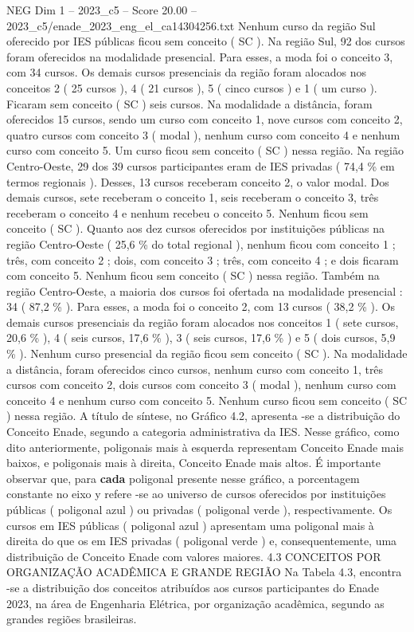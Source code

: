 \begin{textsample}{NEG Dim 1 – 2023\_c5 – Score 20.00 – 2023\_c5/enade\_2023\_eng\_el\_ca14304256.txt}
Nenhum curso da região Sul oferecido por IES públicas ficou sem conceito ( SC ).
Na região Sul, 92 dos cursos foram oferecidos na modalidade presencial.
Para esses, a moda foi o conceito 3, com 34 cursos.
Os demais cursos presenciais da região foram alocados nos conceitos 2 ( 25 cursos ), 4 ( 21 cursos ), 5 ( cinco cursos ) e 1 ( um curso ).
Ficaram sem conceito ( SC ) seis cursos.
Na modalidade a distância, foram oferecidos 15 cursos, sendo um curso com conceito 1, nove cursos com conceito 2, quatro cursos com conceito 3 ( modal ), nenhum curso com conceito 4 e nenhum curso com conceito 5.
Um curso ficou sem conceito ( SC ) nessa região.
Na região Centro-Oeste, 29 dos 39 cursos participantes eram de IES privadas ( 74,4 \% em termos regionais ).
Desses, 13 cursos receberam conceito 2, o valor modal.
Dos demais cursos, sete receberam o conceito 1, seis receberam o conceito 3, três receberam o conceito 4 e nenhum recebeu o conceito 5.
Nenhum ficou sem conceito ( SC ).
Quanto aos dez cursos oferecidos por instituições públicas na região Centro-Oeste ( 25,6 \% do total regional ), nenhum ficou com conceito 1 ; três, com conceito 2 ; dois, com conceito 3 ; três, com conceito 4 ; e dois ficaram com conceito 5.
Nenhum ficou sem conceito ( SC ) nessa região.
Também na região Centro-Oeste, a maioria dos cursos foi ofertada na modalidade presencial : 34 ( 87,2 \% ).
Para esses, a moda foi o conceito 2, com 13 cursos ( 38,2 \% ).
Os demais cursos presenciais da região foram alocados nos conceitos 1 ( sete cursos, 20,6 \% ), 4 ( seis cursos, 17,6 \% ), 3 ( seis cursos, 17,6 \% ) e 5 ( dois cursos, 5,9 \% ).
Nenhum curso presencial da região ficou sem conceito ( SC ).
Na modalidade a distância, foram oferecidos cinco cursos, nenhum curso com conceito 1, três cursos com conceito 2, dois cursos com conceito 3 ( modal ), nenhum curso com conceito 4 e nenhum curso com conceito 5.
Nenhum curso ficou sem conceito ( SC ) nessa região.
A título de síntese, no Gráfico 4.2, apresenta -se a distribuição do Conceito Enade, segundo a categoria administrativa da IES.
Nesse gráfico, como dito anteriormente, poligonais mais à esquerda representam Conceito Enade mais baixos, e poligonais mais à direita, Conceito Enade mais altos.
É importante observar que, para \textbf{cada} poligonal presente nesse gráfico, a porcentagem constante no eixo y refere -se ao universo de cursos oferecidos por instituições públicas ( poligonal azul ) ou privadas ( poligonal verde ), respectivamente.
Os cursos em IES públicas ( poligonal azul ) apresentam uma poligonal mais à direita do que os em IES privadas ( poligonal verde ) e, consequentemente, uma distribuição de Conceito Enade com valores maiores. 4.3 CONCEITOS POR ORGANIZAÇÃO ACADÊMICA E GRANDE REGIÃO Na Tabela 4.3, encontra -se a distribuição dos conceitos atribuídos aos cursos participantes do Enade 2023, na área de Engenharia Elétrica, por organização acadêmica, segundo as grandes regiões brasileiras.

\end{textsample}
